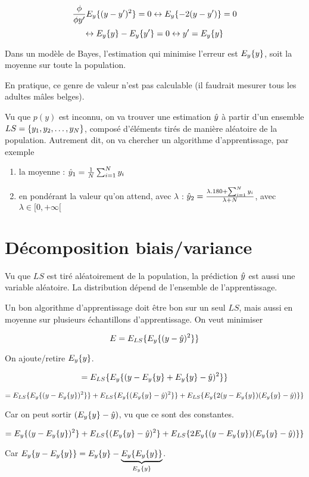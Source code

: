 	$$\frac{\phi}{\phi y'} E_y\{(y - y')^2\} = 0 \leftrightarrow E_y\{-2(y - y')\} = 0$$
	$$\leftrightarrow E_y\{y\} - E_y\{y'\} = 0 \leftrightarrow y' = E_y\{y\}$$
	
	Dans un modèle de Bayes, l'estimation qui minimise l'erreur est $E_y\{y\}$, soit la moyenne sur toute la population.
	
	En pratique, ce genre de valeur n'est pas calculable (il faudrait mesurer tous les adultes mâles belges).
	
	Vu que $p(y)$ est inconnu, on va trouver une estimation $\hat{y}$ à partir d'un ensemble $LS = \lbrace y_1, y_2, \dots , y_N \rbrace$, composé d'éléments tirés de manière aléatoire de la population. Autrement dit, on va chercher un algorithme d'apprentissage, par exemple
	
	\begin{enumerate}
		\item la moyenne : $\hat{y}_1 = \frac{1}{N} \sum_{i = 1}^N y_i$
		\item en pondérant la valeur qu'on attend, avec $\lambda$ : $\hat{y}_2 = \frac{\lambda . 180 + \sum_{i = 1}^N y_i}{\lambda + N}$, avec $\lambda \in [ 0, +\infty [ $
	\end{enumerate}
	
	\section{Décomposition biais/variance}
	
	Vu que $LS$ est tiré aléatoirement de la population, la prédiction $\hat{y}$ est aussi une variable aléatoire. La distribution dépend de l'ensemble de l'apprentissage.
	
	
	Un bon algorithme d'apprentissage doit être bon sur un seul $LS$, mais aussi en moyenne sur plusieurs échantillons d'apprentissage. On veut minimiser 
	
	$$E = E_{LS}\{E_y\{(y - \hat{y})^2\}\}$$
	
	On ajoute/retire $E_y\{y\}$.
	
	$$= E_{LS}\{E_y\{(y - E_y\{y\} + E_y\{y\} - \hat{y})^2\}\}$$
	
	$$= E_{LS}\{E_y\{(y - E_y\{y\})^2\}\} + E_{LS}\{E_y\{(E_y\{y\} - \hat{y})^2\}\} + E_{LS}\{E_y\{2(y - E_y\{y\})(E_y\{y\} - \hat{y})\}\}$$
	
	Car on peut sortir $(E_y\{y\} - \hat{y})$, vu que ce sont des constantes.
	
	$$= E_y\{(y - E_y\{y\})^2\} + E_{LS}\{(E_y\{y\} - \hat{y})^2\} + E_{LS}\{2E_y\{(y - E_y\{y\})(E_y\{y\} - \hat{y})\}\}$$
	
	Car $E_y\{y - E_y\{y\}\} = E_y\{y\} - \underbrace{E_y\{E_y\{y\}\}}_{E_y\{y\}}$.
	
